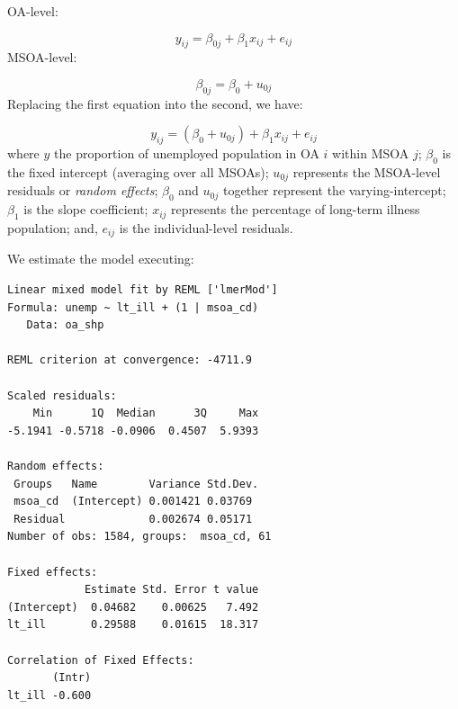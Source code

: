 \documentclass[
  letterpaper,
  DIV=11,
  numbers=noendperiod,
  oneside]{scrreprt}
\newenvironment{Shaded}{\begin{snugshade}}{\end{snugshade}}
\newcommand{\AttributeTok}[1]{\textcolor[rgb]{0.40,0.45,0.13}{#1}}
\newcommand{\CommentTok}[1]{\textcolor[rgb]{0.37,0.37,0.37}{#1}}
\newcommand{\DecValTok}[1]{\textcolor[rgb]{0.68,0.00,0.00}{#1}}
\newcommand{\FunctionTok}[1]{\textcolor[rgb]{0.28,0.35,0.67}{#1}}
\newcommand{\NormalTok}[1]{\textcolor[rgb]{0.00,0.23,0.31}{#1}}
\newcommand{\OtherTok}[1]{\textcolor[rgb]{0.00,0.23,0.31}{#1}}
\newcommand{\SpecialCharTok}[1]{\textcolor[rgb]{0.37,0.37,0.37}{#1}}
\begin{document}
OA-level:

\[y_{ij} = \beta_{0j} + \beta_{1}x_{ij} + e_{ij}\] MSOA-level:

\[\beta_{0j} = \beta_{0} + u_{0j}\] Replacing the first equation into
the second, we have:

\[y_{ij} = (\beta_{0} + u_{0j}) + \beta_{1}x_{ij} + e_{ij}\] where \(y\)
the proportion of unemployed population in OA \(i\) within MSOA \(j\);
\(\beta_{0}\) is the fixed intercept (averaging over all MSOAs);
\(u_{0j}\) represents the MSOA-level residuals or \emph{random effects};
\(\beta_{0}\) and \(u_{0j}\) together represent the varying-intercept;
\(\beta_{1}\) is the slope coefficient; \(x_{ij}\) represents the
percentage of long-term illness population; and, \(e_{ij}\) is the
individual-level residuals.

We estimate the model executing:

\begin{Shaded}
\end{Shaded}

\begin{verbatim}
Linear mixed model fit by REML ['lmerMod']
Formula: unemp ~ lt_ill + (1 | msoa_cd)
   Data: oa_shp

REML criterion at convergence: -4711.9

Scaled residuals: 
    Min      1Q  Median      3Q     Max 
-5.1941 -0.5718 -0.0906  0.4507  5.9393 

Random effects:
 Groups   Name        Variance Std.Dev.
 msoa_cd  (Intercept) 0.001421 0.03769 
 Residual             0.002674 0.05171 
Number of obs: 1584, groups:  msoa_cd, 61

Fixed effects:
            Estimate Std. Error t value
(Intercept)  0.04682    0.00625   7.492
lt_ill       0.29588    0.01615  18.317

Correlation of Fixed Effects:
       (Intr)
lt_ill -0.600
\end{verbatim}
\end{document}
